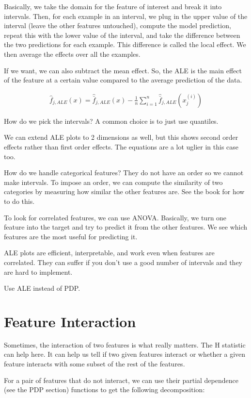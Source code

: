 \documentclass[a4paper]{article}
\begin{document}
Basically, we take the domain for the feature of interest and break it into
intervals. Then, for each example in an interval, we plug in the upper value
of the interval (leave the other features untouched), compute the model
prediction, repeat this with the lower value of the interval, and take the
difference between the two predictions for each example. This difference is
called the local effect. We then average the effects over all the examples.

If we want, we can also subtract the mean effect. So, the ALE is the main effect
of the feature at a certain value compared to the average prediction of the data.

\begin{align}
  \hat{f}_{j, ALE}(x) = \hat{\bar{f}}_{j, ALE}(x) - \frac{1}{n} \sum_{i=1}^{n}{
    \hat{\bar{f}}_{j, ALE}(x_j^{(i)})
  }
\end{align}

How do we pick the intervals? A common choice is to just use quantiles.

We can extend ALE plots to 2 dimensions as well, but this shows second order
effects rather than first order effects. The equations are a lot uglier in this
case too.

How do we handle categorical features? They do not have an order so we cannot
make intervals. To impose an order, we can compute the similarity of two
categories by measuring how similar the other features are. See the book for
how to do this.

To look for correlated features, we can use ANOVA. Basically, we turn one
feature into the target and try to predict it from the other features. We see
which features are the most useful for predicting it.

ALE plots are efficient, interpretable, and work even when features are
correlated. They can suffer if you don't use a good number of intervals and
they are hard to implement.

Use ALE instead of PDP.

\section{Feature Interaction}
Sometimes, the interaction of two features is what really matters. The H
statistic can help here. It can help us tell if two given features interact
or whether a given feature interacts with some subset of the rest of the
features.

For a pair of features that do not interact, we can use their partial dependence
(see the PDP section) functions to get the following decomposition:
\end{document}
